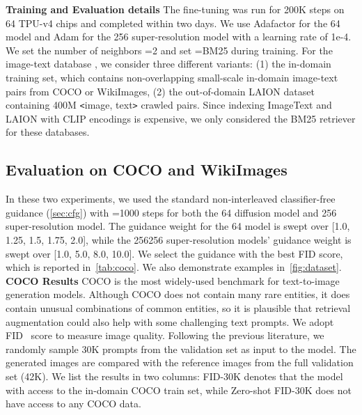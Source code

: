 \documentclass{article} \usepackage{iclr2023_conference,times}
\begin{document}
\noindent \textbf{Training and Evaluation details}
The fine-tuning was run for 200K steps on 64 TPU-v4 chips and completed within two days. We use Adafactor for the 64 model and Adam for the 256 super-resolution model with a learning rate of 1e-4. We set the number of neighbors =2 and set =BM25 during training. For the image-text database , we consider three different variants: {(1)} the in-domain training set, which contains non-overlapping small-scale in-domain image-text pairs from COCO or WikiImages, {(2)} the out-of-domain LAION dataset~\citep{schuhmann2021laion} containing 400M \texttt{<}image, text\texttt{>} crawled pairs. Since indexing ImageText and LAION with CLIP encodings is expensive, we only considered the BM25 retriever for these databases. 


\subsection{Evaluation on COCO and WikiImages}
In these two experiments, we used the standard non-interleaved classifier-free guidance (\autoref{sec:cfg}) with =1000 steps for both the 64 diffusion model and 256 super-resolution model. The guidance weight  for the 64 model is swept over [1.0, 1.25, 1.5, 1.75, 2.0], while the 256256 super-resolution models' guidance weight  is swept over [1.0, 5.0, 8.0, 10.0]. We select the guidance  with the best FID score, which is reported in~\autoref{tab:coco}. We also demonstrate examples in~\autoref{fig:dataset}. \vspace{1ex} \\
\noindent \textbf{COCO Results}
COCO is the most widely-used benchmark for text-to-image generation models. Although COCO does not contain many rare entities, it does contain unusual combinations of common entities, so it is plausible that retrieval augmentation could also help with some challenging text prompts. We adopt FID~\citep{heusel2017gans} score to measure image quality. Following the previous literature, we randomly sample 30K prompts from the validation set as input to the model. The generated images are compared with the reference images from the full validation set (42K). We list the results in two columns: FID-30K denotes that the model with access to the in-domain COCO train set, while Zero-shot FID-30K does not have access to any COCO data. 
\end{document}
